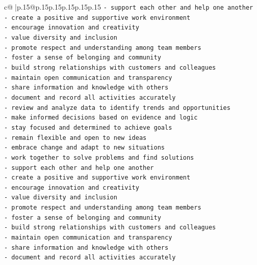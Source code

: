 \documentclass{article}
\begin{document}
{\begin{supertabular}{c@{$\;$}|p{.15\linewidth}@{}p{.15\linewidth}p{.15\linewidth}p{.15\linewidth}p{.15\linewidth}p{.15\linewidth}}
{{{\texttt{{-} support each other and help one another} \\
\texttt{{-} create a positive and supportive work environment} \\
\texttt{{-} encourage innovation and creativity} \\
\texttt{{-} value diversity and inclusion} \\
\texttt{{-} promote respect and understanding among team members} \\
\texttt{{-} foster a sense of belonging and community} \\
\texttt{{-} build strong relationships with customers and colleagues} \\
\texttt{{-} maintain open communication and transparency} \\
\texttt{{-} share information and knowledge with others} \\
\texttt{{-} document and record all activities accurately} \\
\texttt{{-} review and analyze data to identify trends and opportunities} \\
\texttt{{-} make informed decisions based on evidence and logic} \\
\texttt{{-} stay focused and determined to achieve goals} \\
\texttt{{-} remain flexible and open to new ideas} \\
\texttt{{-} embrace change and adapt to new situations} \\
\texttt{{-} work together to solve problems and find solutions} \\
\texttt{{-} support each other and help one another} \\
\texttt{{-} create a positive and supportive work environment} \\
\texttt{{-} encourage innovation and creativity} \\
\texttt{{-} value diversity and inclusion} \\
\texttt{{-} promote respect and understanding among team members} \\
\texttt{{-} foster a sense of belonging and community} \\
\texttt{{-} build strong relationships with customers and colleagues} \\
\texttt{{-} maintain open communication and transparency} \\
\texttt{{-} share information and knowledge with others} \\
\texttt{{-} document and record all activities accurately} \\
}}}
\end{supertabular}}
\end{document}
